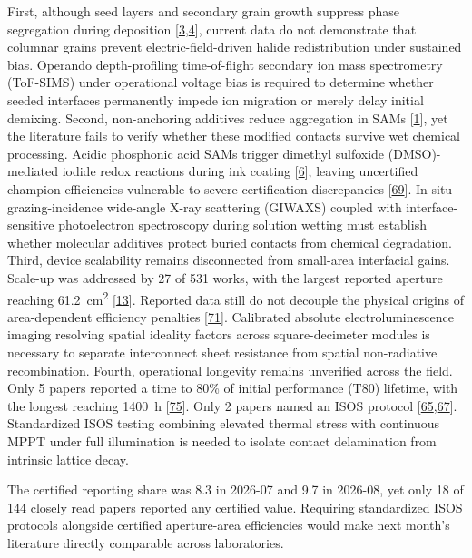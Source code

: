 \documentclass[
  11pt,
]{article}
\begin{document}
First, although seed layers and secondary grain growth suppress phase
segregation during deposition
{[}\href{https://doi.org/10.1038/s41467-026-76713-y}{3},\href{https://doi.org/10.1016/j.joule.2026.102645}{4}{]},
current data do not demonstrate that columnar grains prevent
electric-field-driven halide redistribution under sustained bias.
Operando depth-profiling time-of-flight secondary ion mass spectrometry
(ToF-SIMS) under operational voltage bias is required to determine
whether seeded interfaces permanently impede ion migration or merely
delay initial demixing. Second, non-anchoring additives reduce
aggregation in SAMs
{[}\href{https://doi.org/10.1038/s41467-026-76266-0}{1}{]}, yet the
literature fails to verify whether these modified contacts survive wet
chemical processing. Acidic phosphonic acid SAMs trigger dimethyl
sulfoxide (DMSO)-mediated iodide redox reactions during ink coating
{[}\href{https://doi.org/10.1126/science.aeg8415}{6}{]}, leaving
uncertified champion efficiencies vulnerable to severe certification
discrepancies {[}\href{https://doi.org/10.1002/adma.74438}{69}{]}. In
situ grazing-incidence wide-angle X-ray scattering (GIWAXS) coupled with
interface-sensitive photoelectron spectroscopy during solution wetting
must establish whether molecular additives protect buried contacts from
chemical degradation. Third, device scalability remains disconnected
from small-area interfacial gains. Scale-up was addressed by 27 of 531
works, with the largest reported aperture reaching
\qty{61.2}{\centi\meter\squared}
{[}\href{https://doi.org/10.1002/smll.75068}{13}{]}. Reported data still
do not decouple the physical origins of area-dependent efficiency
penalties {[}\href{https://doi.org/10.1038/s41467-026-76425-3}{71}{]}.
Calibrated absolute electroluminescence imaging resolving spatial
ideality factors across square-decimeter modules is necessary to
separate interconnect sheet resistance from spatial non-radiative
recombination. Fourth, operational longevity remains unverified across
the field. Only 5 papers reported a time to 80\% of initial performance
(T80) lifetime, with the longest reaching \qty{1400}{\hour}
{[}\href{https://doi.org/10.1002/anie.6548693}{75}{]}. Only 2 papers
named an ISOS protocol
{[}\href{https://doi.org/10.1002/anie.4221605}{65},\href{https://doi.org/10.1038/s41467-026-76848-y}{67}{]}.
Standardized ISOS testing combining elevated thermal stress with
continuous MPPT under full illumination is needed to isolate contact
delamination from intrinsic lattice decay.

The certified reporting share was 8.3 in 2026-07 and 9.7 in 2026-08, yet
only 18 of 144 closely read papers reported any certified value.
Requiring standardized ISOS protocols alongside certified aperture-area
efficiencies would make next month's literature directly comparable
across laboratories.
\end{document}
